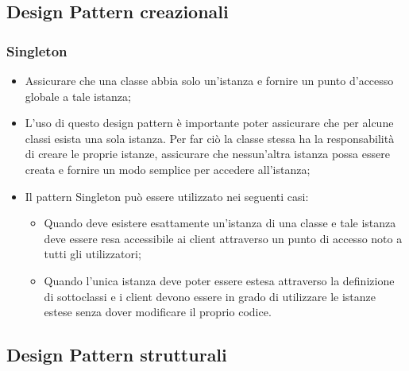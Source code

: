 \subsection{Design Pattern creazionali}
\subsubsection{Singleton}
\begin{itemize}
\item {} Assicurare che una classe abbia solo un'istanza e fornire un punto d'accesso globale a tale istanza;
\item {} L'uso di questo design pattern è importante poter assicurare che per alcune classi esista una sola istanza. Per far ciò la classe stessa ha la responsabilità di creare le proprie istanze, assicurare che nessun'altra istanza possa essere creata e fornire un modo semplice per accedere all'istanza;
\item {} Il pattern Singleton può essere utilizzato nei seguenti casi:
\begin{itemize}
\item Quando deve esistere esattamente un'istanza di una classe e tale istanza deve essere resa accessibile ai client attraverso un punto di accesso noto a tutti gli utilizzatori;
\item Quando l'unica istanza deve poter essere estesa attraverso la definizione di sottoclassi e i client devono essere in grado di utilizzare le istanze estese senza dover modificare il proprio codice.
\end{itemize}
\end{itemize}

\subsection{Design Pattern strutturali}
